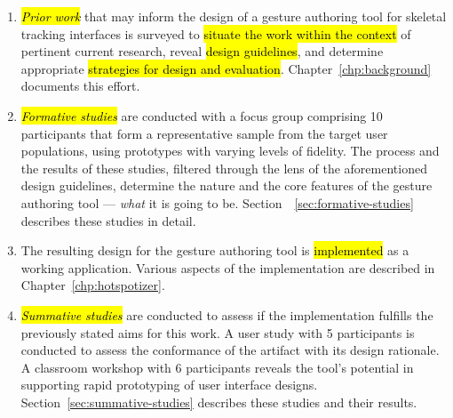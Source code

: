 \begin{enumerate}
\item \hl{\emph{Prior work}} that may inform the design of a gesture authoring tool for skeletal tracking interfaces is surveyed to \hl{situate the work within the context} of pertinent current research, reveal \hl{design guidelines}, and determine appropriate \hl{strategies for design and evaluation}. Chapter~\ref{chp:background} documents this effort.
\item \hl{\emph{Formative studies}} are conducted with a focus group comprising 10 participants that form a representative sample from the target user populations, using prototypes with varying levels of fidelity. The process and the results of these studies, filtered through the lens of the aforementioned design guidelines, determine the nature and the core features of the gesture authoring tool --- \emph{what} it is going to be. Section~~\ref{sec:formative-studies} describes these studies in detail.
\item The resulting design for the gesture authoring tool is \hl{implemented} as a working application. Various aspects of the implementation are described in Chapter~\ref{chp:hotspotizer}.
\item \hl{\emph{Summative studies}} are conducted to assess if the implementation fulfills the previously stated aims for this work. A user study with 5 participants is conducted to assess the conformance of the artifact with its design rationale. A classroom workshop with 6 participants reveals the tool's potential in supporting rapid prototyping of user interface designs. Section~\ref{sec:summative-studies} describes these studies and their results.
\end{enumerate}
